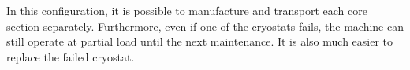 \documentclass[12pt]{IET02}
\begin{document}
In this configuration, it is possible to manufacture and transport each core section separately. Furthermore, even if one of the cryostats fails, the machine can still operate at partial load until the next maintenance. It is also much easier to replace the failed cryostat. 

\begin{figure}[]
  \centering
    \hfill
   \hfill 

\end{figure}
\end{document}
